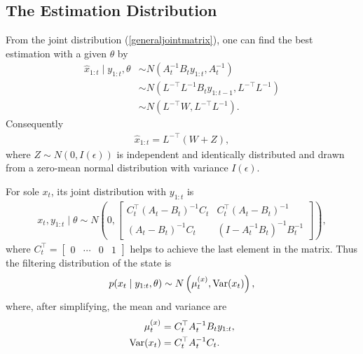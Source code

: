 \subsection{The Estimation Distribution}\label{generalEstDistr}

From the joint distribution (\ref{generaljointmatrix}), one can find the best estimation with a given $\theta$ by
\begin{align*}
\hat{x}_{1:t} \mid y_{1:t},\theta &\sim N \left( A_{t}^{-1}B_{t}y_{1:t}, A_{t}^{-1} \right) \\
&\sim N(L^{-\top}L^{-1}B_{t}y_{1:t-1},L^{-\top}L^{-1})\\
&\sim N(L^{-\top}W,L^{-\top}L^{-1}).
\end{align*}
Consequently 
\begin{align*}
\hat{x}_{1:t} = L^{-\top}(W+Z),
\end{align*}
where $Z \sim N(0, I(\epsilon))$ is independent and identically distributed and drawn from a zero-mean normal distribution with variance $ I(\epsilon)$. 

For sole $x_{t}$, its joint distribution with $y_{1:t}$ is 
\begin{align*}
x_{t}, y_{1:t}\mid \theta \sim N\left( 0, \begin{bmatrix}
C_{t}^\top(A_{t}-B_{t}) ^{-1}C_{t} & C_{t}^\top (A_{t}-B_{t})^{-1}\\
(A_{t}-B_{t})^{-1}C_{t} & (I- A_{t}^{-1}B_{t}) ^{-1}B_{t}^{-1}
\end{bmatrix} \right),
\end{align*}
where $C_t^\top = \begin{bmatrix}0 & \cdots & 0 & 1\end{bmatrix}$ helps to  achieve the last element in the matrix. Thus the filtering distribution of the state is 
\begin{align*}
p(x_{t}\mid y_{1:t},\theta) \sim N\left( \mu_{t}^{(x)},\mathrm{Var}(x_{t}) \right),
\end{align*}
where, after simplifying, the mean and variance are  
\begin{align}\label{generalmux}
\mu_{t}^{(x)} & = C_{t}^\top A_{t}^{-1}B_{t}y_{1:t} ,\\
\mathrm{Var}(x_{t})& =C_{t}^\top A_{t}^{-1}C_{t}. \label{generalSigx}
\end{align}

